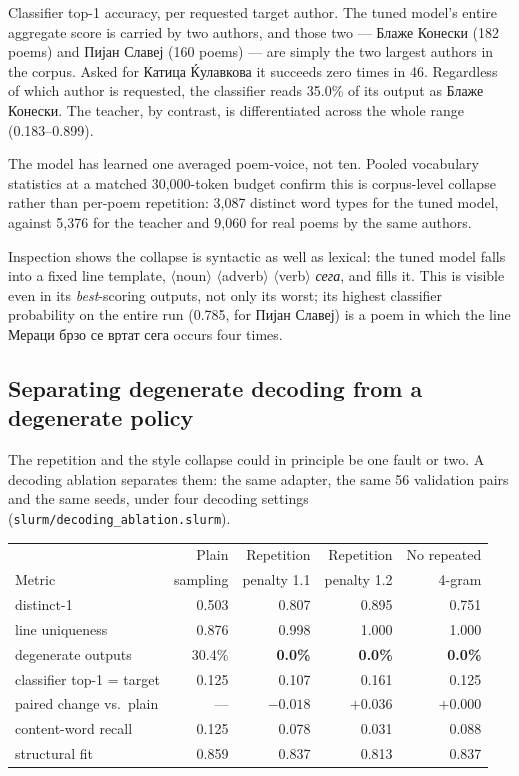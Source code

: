 \documentclass[11pt]{article}
\begin{document}
\noindent
Classifier top-1 accuracy, per requested target author. The tuned model's
entire aggregate score is carried by two authors, and those two ---
Блаже Конески (182 poems) and Пијан Славеј
(160 poems) --- are simply the two largest authors in the corpus. Asked for
Катица Ќулавкова it succeeds zero times in 46. Regardless of
which author is requested, the classifier reads 35.0\% of its output as
Блаже Конески. The teacher, by contrast, is differentiated
across the whole range (0.183--0.899).

The model has learned one averaged poem-voice, not ten. Pooled vocabulary
statistics at a matched 30{,}000-token budget confirm this is corpus-level
collapse rather than per-poem repetition: 3{,}087 distinct word types for the
tuned model, against 5{,}376 for the teacher and 9{,}060 for real poems by the
same authors.

Inspection shows the collapse is syntactic as well as lexical: the tuned model
falls into a fixed line template, $\langle$noun$\rangle$ $\langle$adverb$\rangle$ $\langle$verb$\rangle$ \emph{сега}, and fills it.
This is visible even in its \emph{best}-scoring outputs, not only its worst;
its highest classifier probability on the entire run (0.785, for
Пијан Славеј) is a poem in which the line
Мераци брзо се вртат сега occurs four times.

\subsection{Separating degenerate decoding from a degenerate
policy}\label{sec:decodeablation}

The repetition and the style collapse could in principle be one fault or two.
A decoding ablation separates them: the same adapter, the same 56 validation
pairs and the same seeds, under four decoding settings
(\texttt{slurm/decoding\_ablation.slurm}).

\begin{center}
\begin{tabular}{lrrrr}
\toprule
& Plain & Repetition & Repetition & No repeated \\
Metric & sampling & penalty 1.1 & penalty 1.2 & 4-gram \\
\midrule
distinct-1                    & 0.503 & 0.807 & 0.895 & 0.751 \\
line uniqueness               & 0.876 & 0.998 & 1.000 & 1.000 \\
degenerate outputs            & 30.4\% & \textbf{0.0\%} & \textbf{0.0\%} & \textbf{0.0\%} \\
\midrule
classifier top-1 = target     & 0.125 & 0.107 & 0.161 & 0.125 \\
\quad paired change vs.\ plain & ---   & $-0.018$ & $+0.036$ & $+0.000$ \\
\midrule
content-word recall           & 0.125 & 0.078 & 0.031 & 0.088 \\
structural fit                & 0.859 & 0.837 & 0.813 & 0.837 \\
\bottomrule
\end{tabular}
\end{center}
\end{document}
